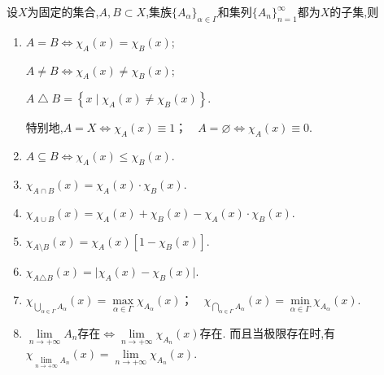 \documentclass[../../main.tex]{subfiles}%
\begin{document}
\begin{proposition}[特征函数的基本性质]\label{proposition:特征函数的基本性质}
设$X$为固定的集合,$A,B\subset X$,集族$\{A_\alpha\}_{\alpha\in \Gamma}$和集列$\{A_n\}_{n=1}^{\infty}$都为$X$的子集,则
\begin{enumerate}[(1)]
\item\label{proposition:特征函数的基本性质-1}  $A = B \iff \chi_A(x) = \chi_B(x)$;

$A\neq B\iff \chi_A(x)\neq \chi_B(x)$;

$A\bigtriangleup B=\left\{ x\mid \chi _A\left( x \right) \ne \chi _B\left( x \right) \right\}$.

特别地,$A=X\iff \chi_A(x)\equiv1$；$\quad A=\varnothing\iff \chi_A(x)\equiv0$.

\item\label{proposition:特征函数的基本性质-2} $A \subseteq B \iff \chi_A(x) \leqslant \chi_B(x)$.

\item\label{proposition:特征函数的基本性质-3}$\chi_{A \cap B}(x) = \chi_A(x) \cdot \chi_B(x)$.

\item\label{proposition:特征函数的基本性质-4} $\chi_{A \cup B}(x) = \chi_A(x) + \chi_B(x) - \chi_A(x) \cdot \chi_B(x)$.

\item\label{proposition:特征函数的基本性质-5}\(\chi_{A\setminus B}(x)=\chi_A(x)[1 - \chi_B(x)]\).

\item\label{proposition:特征函数的基本性质-6} \(\chi_{A\triangle B}(x)=\vert\chi_A(x)-\chi_B(x)\vert\).

\item\label{proposition:特征函数的基本性质-7} $\chi_{\bigcup_{\alpha\in\Gamma}A_\alpha}(x)=\max\limits_{\alpha\in\Gamma}\chi_{A_\alpha}(x)$；$\quad \chi_{\bigcap_{\alpha\in\Gamma}A_\alpha}(x)=\min\limits_{\alpha\in\Gamma}\chi_{A_\alpha}(x)$.
 
\item\label{proposition:特征函数的基本性质-8} $\lim\limits_{n\to+\infty}A_n\text{存在}\iff \lim\limits_{n\to+\infty}\chi_{A_n}(x)\text{存在}.$
而且当极限存在时,有
$\chi_{\lim\limits_{n\to+\infty}A_n}(x)=\lim\limits_{n\to+\infty}\chi_{A_n}(x).$
\end{enumerate} 
\end{proposition}
\end{document}
